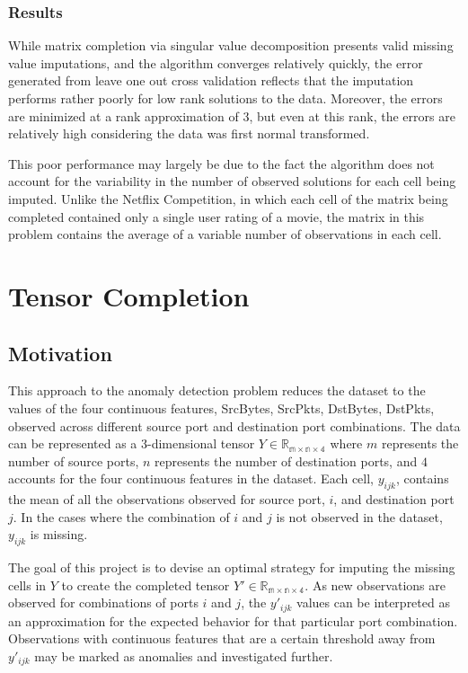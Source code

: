 \documentclass[12pt,twoside]{dukestatscithesis}
\theoremstyle{definition}
\theoremstyle{definition}
\theoremstyle{definition}
\theoremstyle{remark}
\begin{document}
\subsection{Results}\label{results}

While matrix completion via singular value decomposition presents valid
missing value imputations, and the algorithm converges relatively
quickly, the error generated from leave one out cross validation
reflects that the imputation performs rather poorly for low rank
solutions to the data. Moreover, the errors are minimized at a rank
approximation of 3, but even at this rank, the errors are relatively
high considering the data was first normal transformed.

This poor performance may largely be due to the fact the algorithm does
not account for the variability in the number of observed solutions for
each cell being imputed. Unlike the Netflix Competition, in which each
cell of the matrix being completed contained only a single user rating
of a movie, the matrix in this problem contains the average of a
variable number of observations in each cell.

\chapter{Tensor Completion}\label{tensor-completion}

\section{Motivation}\label{motivation-2}

This approach to the anomaly detection problem reduces the dataset to
the values of the four continuous features, SrcBytes, SrcPkts, DstBytes,
DstPkts, observed across different source port and destination port
combinations. The data can be represented as a 3-dimensional tensor
\(Y \in \mathbb{R_{m \times n \times 4}}\) where \(m\) represents the
number of source ports, \(n\) represents the number of destination
ports, and \(4\) accounts for the four continuous features in the
dataset. Each cell, \(y_{ijk}\), contains the mean of all the
observations observed for source port, \(i\), and destination port
\(j\). In the cases where the combination of \(i\) and \(j\) is not
observed in the dataset, \(y_{ijk}\) is missing.

The goal of this project is to devise an optimal strategy for imputing
the missing cells in \(Y\) to create the completed tensor
\(Y' \in \mathbb{R_{m \times n \times 4}}\). As new observations are
observed for combinations of ports \(i\) and \(j\), the \(y'_{ijk}\)
values can be interpreted as an approximation for the expected behavior
for that particular port combination. Observations with continuous
features that are a certain threshold away from \(y'_{ijk}\) may be
marked as anomalies and investigated further.
\end{document}
